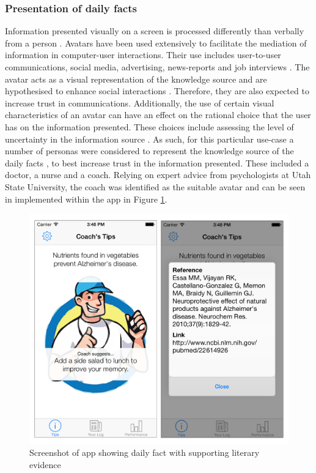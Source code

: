 \subsubsection{Presentation of daily facts}
Information presented visually on a screen is processed differently than verbally from a person \cite{Sundar2015}. Avatars have been used extensively to facilitate the mediation of information in computer-user interactions. Their use includes user-to-user communications, social media, advertising, news-reports and job interviews \cite{Sundar2015}. The avatar acts as a visual representation of the knowledge source \cite{Bente2008} and are hypothesised to enhance social interactions \cite{Blascovich2002}. Therefore, they are also expected to increase trust in communications. Additionally, the use of certain visual characteristics of an avatar can have an effect on the rational choice that the user has on the information presented. These choices include assessing the level of uncertainty in the information  source \cite{Afifi2000}. As such, for this particular use-case a number of personas were considered to represent the knowledge source of the daily facts \cite{Sundar2015}, to best increase trust in the information presented. These included a doctor, a nurse and a coach. Relying on expert advice from psychologists at Utah State University, the coach was identified as the suitable avatar and can be seen in implemented within the app in Figure \ref{fig: screenshot-dailyfact}.

\begin{figure}[h]
    \centering
    \includegraphics[scale=0.25, angle=0]{Files/prevention-study-1/figures/screenshot-dailyfact.png}
    \caption{Screenshot of app showing daily fact with supporting literary evidence}
    \label{fig: screenshot-dailyfact}
\end{figure}

